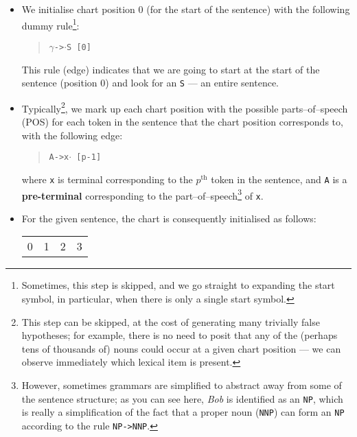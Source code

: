 \documentclass[a4paper]{article}
\begin{document}
\begin{enumerate}
\begin{enumerate}
\begin{enumerate}
\begin{itemize}
Where \texttt{A} is a non-terminal, \texttt{B} and \texttt{C} are zero or more terminals or non-terminals\footnote{It is typically more efficient to transform the grammar so that the right-hand side of each rule consists of only non-terminals, or a single terminal. This is a simpler process than the conversion into Chomsky Normal Form.}, and \texttt{m} is the chart index where the edge was created\footnote{Sometimes this is written as \texttt{[m,n]}, where \texttt{n} is the (redundant) chart index of where the edge is currently stored.}.
\item We initialise chart position 0 (for the start of the sentence) with the following dummy rule\footnote{Sometimes, this step is skipped, and we go straight to expanding the start symbol, in particular, when there is only a single start symbol.}:
\begin{quote}
$\gamma$\texttt{->}$\cdot$\texttt{S [0]}
\end{quote}
This rule (edge) indicates that we are going to start at the start of the sentence (position 0) and look for an \texttt{S} --- an entire sentence.
\item Typically\footnote{This step can be skipped, at the cost of generating many trivially false hypotheses; for example, there is no need to posit that any of the (perhaps tens of thousands of) nouns could occur at a given chart position --- we can observe immediately which lexical item is present.}, we mark up each chart position with the possible parts--of--speech (POS) for each token in the sentence that the chart position corresponds to, with the following edge:
\begin{quote}
\texttt{A->x}$\cdot$\texttt{ [p-1]}
\end{quote}
where \texttt{x} is terminal corresponding to the $p^\textrm{th}$ token in the sentence, and \texttt{A} is a \textbf{pre-terminal} corresponding to the part--of--speech\footnote{However, sometimes grammars are simplified to abstract away from some of the sentence structure; as you can see here, \textit{Bob} is identified as an \texttt{NP}, which is really a simplification of the fact that a proper noun (\texttt{NNP}) can form an \texttt{NP} according to the rule \texttt{NP->NNP}.} of \texttt{x}.
\item For the given sentence, the chart is consequently initialised as follows:
\begin{table}[hp]
\centering
\begin{tabular}{l|l|l|l}
\multicolumn{1}{c}{0} & \multicolumn{1}{c}{1} &\multicolumn{1}{c}{2} & \multicolumn{1}{c}{3} \\

\end{tabular}
\end{table}
\end{itemize}
\end{enumerate}
\end{enumerate}
\end{enumerate}
\end{document}
